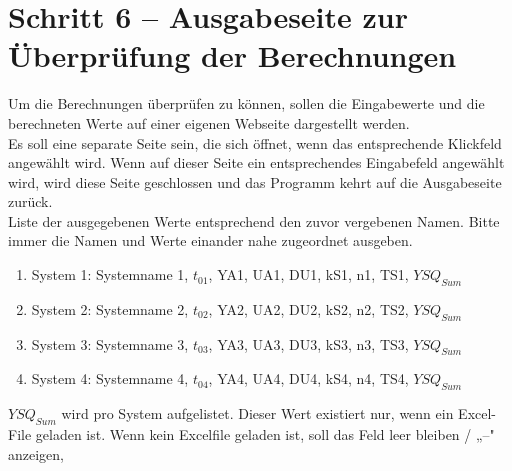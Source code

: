 \documentclass[main.tex]{subfiles}
\begin{document}
\section{Schritt 6 – Ausgabeseite zur Überprüfung der Berechnungen}
\label{sec:Schritt6}  %
Um die Berechnungen überprüfen zu können, sollen die Eingabewerte und die berechneten Werte  %
auf einer eigenen Webseite dargestellt werden.\\ 
Es soll eine separate Seite sein, die sich öffnet, wenn das entsprechende Klickfeld angewählt wird. Wenn auf dieser Seite ein entsprechendes Eingabefeld angewählt wird, wird diese Seite geschlossen und das Programm kehrt auf die Ausgabeseite zurück.\\ %
Liste der ausgegebenen Werte entsprechend den zuvor vergebenen Namen. Bitte immer die Namen und Werte einander nahe zugeordnet ausgeben.\\
\begin{enumerate}
    \item System 1: Systemname 1, $t_{01}$, YA1, UA1, DU1, kS1, n1, TS1, $YSQ_{Sum}$
    \item System 2: Systemname 2, $t_{02}$, YA2, UA2, DU2, kS2, n2, TS2, $YSQ_{Sum}$
    \item System 3: Systemname 3, $t_{03}$, YA3, UA3, DU3, kS3, n3, TS3, $YSQ_{Sum}$
    \item System 4: Systemname 4, $t_{04}$, YA4, UA4, DU4, kS4, n4, TS4, $YSQ_{Sum}$
\end{enumerate}
$YSQ_{Sum}$ wird pro System aufgelistet. Dieser Wert existiert nur, wenn ein Excel-File geladen ist. Wenn kein Excelfile geladen ist, soll das Feld leer bleiben / „–" anzeigen, 
\end{document}
